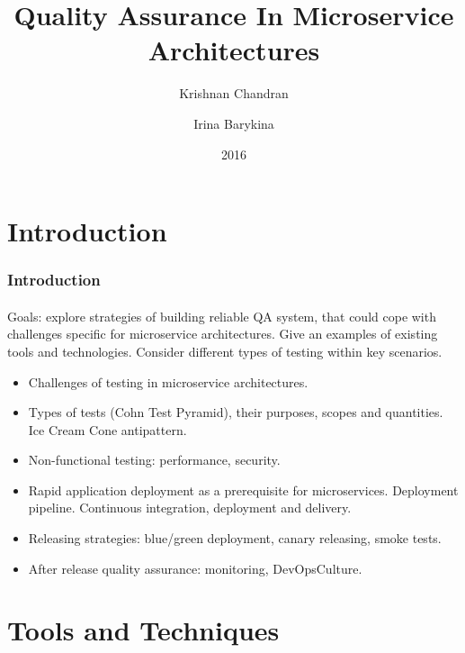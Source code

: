 \documentclass{beamer}
\title{Quality Assurance In Microservice Architectures}
\author{Krishnan Chandran \and Irina Barykina}
\institute[NYU]
{
Department of Informatics,\\
Intelligent Adaptive Systems, UHH\\
}
\date{2016}
\begin{document}
\begin{frame}
\titlepage
\end{frame}


\section{Introduction}

\begin{frame}
	\frametitle{Introduction}	
	\framesubtitle{}
	Goals: explore strategies of building reliable QA system, that could cope with challenges specific for microservice architectures. Give an examples of existing tools and technologies.
        Consider different types of testing within key scenarios.

	\begin{itemize}
 		 \item Challenges of testing in microservice architectures.
		 \item Types of tests (Cohn Test Pyramid), their purposes, scopes and quantities. Ice Cream Cone antipattern.
		 \item Non-functional testing: performance, security.
		 \item Rapid application deployment as a prerequisite for microservices. Deployment pipeline. Continuous integration, deployment and delivery.
		 \item Releasing strategies: blue/green deployment, canary releasing, smoke tests.
		 \item After release quality assurance: monitoring, DevOpsCulture. 
	\end{itemize}
\end{frame}


\section{Tools and Techniques}
\end{document}

